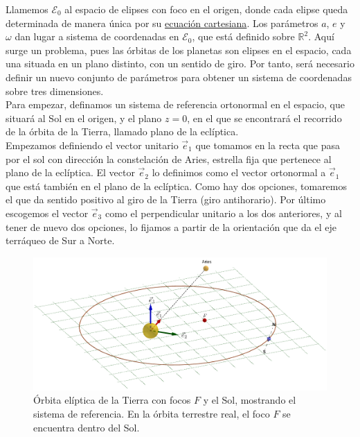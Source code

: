 \documentclass[11pt]{article}
\begin{document}
Llamemos $\mathcal{E}_0$ al espacio de elipses con foco en el origen, donde cada elipse queda determinada de manera única por su \hyperref[eq:elipse_cartesiana]{ecuación cartesiana}. Los parámetros $a$, $e$ y $\omega$ dan lugar a sistema de coordenadas en $\mathcal{E}_0$, que está definido sobre $\mathbb{R}^2$. Aquí surge un problema, pues las órbitas de los planetas son elipses en el espacio, cada una situada en un plano distinto, con un sentido de giro. Por tanto, será necesario definir un nuevo conjunto de parámetros para obtener un sistema de coordenadas sobre tres dimensiones.\\

Para empezar, definamos un sistema de referencia ortonormal en el espacio, que situará al Sol en el origen, y el plano $z=0$, en el que se encontrará el recorrido de la órbita de la Tierra, llamado plano de la eclíptica.\\

Empezamos definiendo el vector unitario $\vec{e}_1$ que tomamos en la recta que pasa por el sol con dirección la constelación de Aries, estrella fija que pertenece al plano de la eclíptica. El vector $\vec{e}_2$ lo definimos como el vector ortonormal a $\vec{e}_1$ que está también en el plano de la eclíptica. Como hay dos opciones, tomaremos el que da sentido positivo al giro de la Tierra (giro antihorario). Por último escogemos el vector $\vec{e}_3$ como el perpendicular unitario a los dos anteriores, y al tener de nuevo dos opciones, lo fijamos a partir de la orientación que da el eje terráqueo de Sur a Norte.\\

\begin{figure}[H]
\centering
\includegraphics[scale=0.35]{images/sistema_referencia_1.png}
\caption{Órbita elíptica de la Tierra con focos $F$ y el Sol, mostrando el sistema de referencia. En la órbita terrestre real, el foco $F$ se encuentra dentro del Sol.}
\label{fig:sistema_referencia}
\end{figure}
\end{document}

